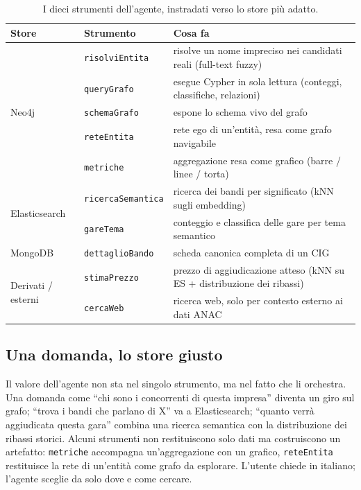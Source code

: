 \documentclass[11pt,a4paper]{article}
\begin{document}
\begin{table}[H]
\centering
\footnotesize
\begin{tabular}{@{}llp{7.4cm}@{}}
\toprule
\textbf{Store} & \textbf{Strumento} & \textbf{Cosa fa}\\
\midrule
\multirow{5}{*}{Neo4j}
 & \texttt{risolviEntita}   & risolve un nome impreciso nei candidati reali (full-text fuzzy)\\
 & \texttt{queryGrafo}      & esegue Cypher in sola lettura (conteggi, classifiche, relazioni)\\
 & \texttt{schemaGrafo}     & espone lo schema vivo del grafo\\
 & \texttt{reteEntita}      & rete ego di un'entità, resa come grafo navigabile\\
 & \texttt{metriche}        & aggregazione resa come grafico (barre / linee / torta)\\
\midrule
\multirow{2}{*}{Elasticsearch}
 & \texttt{ricercaSemantica}& ricerca dei bandi per significato (kNN sugli embedding)\\
 & \texttt{gareTema}        & conteggio e classifica delle gare per tema semantico\\
\midrule
MongoDB
 & \texttt{dettaglioBando}  & scheda canonica completa di un CIG\\
\midrule
\multirow{2}{*}{Derivati / esterni}
 & \texttt{stimaPrezzo}     & prezzo di aggiudicazione atteso (kNN su ES + distribuzione dei ribassi)\\
 & \texttt{cercaWeb}        & ricerca web, solo per contesto esterno ai dati ANAC\\
\bottomrule
\end{tabular}
\caption{I dieci strumenti dell'agente, instradati verso lo store più adatto.}
\label{tab:tools}
\end{table}

\subsection{Una domanda, lo store giusto}

Il valore dell'agente non sta nel singolo strumento, ma nel fatto che li orchestra. Una domanda
come \enquote{chi sono i concorrenti di questa impresa} diventa un giro sul grafo; \enquote{trova
i bandi che parlano di X} va a Elasticsearch; \enquote{quanto verrà aggiudicata questa gara}
combina una ricerca semantica con la distribuzione dei ribassi storici. Alcuni strumenti non
restituiscono solo dati ma costruiscono un artefatto: \texttt{metriche} accompagna
un'aggregazione con un grafico, \texttt{reteEntita} restituisce la rete di un'entità come grafo
da esplorare. L'utente chiede in italiano; l'agente sceglie da solo dove e come cercare.
\end{document}
